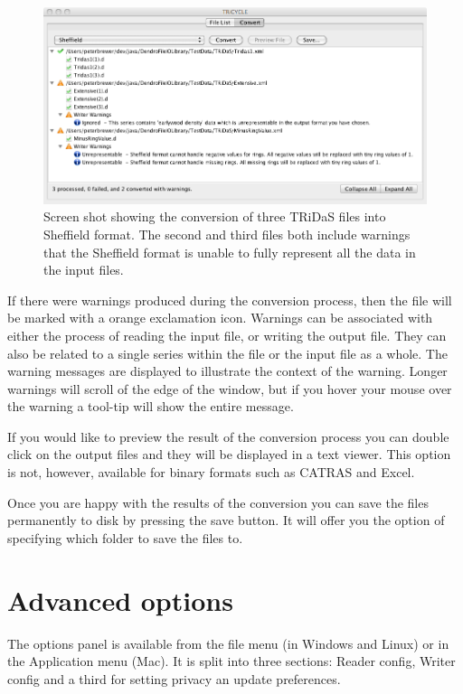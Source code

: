 \documentclass[10pt, headsepline,DIV14,BCOR0.5cm]{scrreprt}
\begin{document}
\begin{figure}
\includegraphics[width=\textwidth]{screenshot1.png}
\caption{Screen shot showing the conversion of three TRiDaS files into Sheffield
format. The second and third files both include warnings that the Sheffield format
is unable to fully represent all the data in the input files.} 
\label{fig:screenshot}
\end{figure}

If there were warnings produced during the conversion process, then the file will be marked with a orange
exclamation icon. Warnings can be associated with either the process of reading the input file, or writing
the output file. They can also be related to a single series within the file or the input file as a whole. The
warning messages are displayed to illustrate the context of the warning. Longer warnings will scroll of the
edge of the window, but if you hover your mouse over the warning a tool-tip will show the entire message.

If you would like to preview the result of the conversion process you can double click on the output files
and they will be displayed in a text viewer. This option is not, however, available for binary formats such
as CATRAS and Excel.

Once you are happy with the results of the conversion you can save the files permanently to disk by pressing
the save button. It will offer you the option of specifying which folder to save the files to.


\chapter{Advanced options}

The options panel is available from the file menu (in Windows and Linux) or in the Application menu (Mac). It is split into three sections: Reader config, Writer
config and a third for setting privacy an update preferences.
\end{document}
